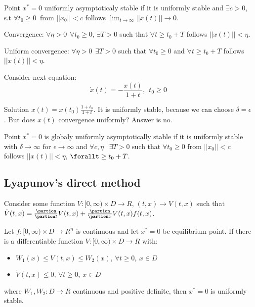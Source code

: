  Point $x^*=0$ uniformly asymptoticaly stable if it is uniformly stable and 
 $\exists c>0$, s.t $\forall t_0 \ge 0\ $ from $||x_0||<c$
 follows $\lim_{t\to \infty} ||x(t)|| \to 0$.


 Convergence: $\forall \eta > 0 \ \ \forall t_0 \ge 0$, $\exists T>0$ such
 that $\forall t \ge t_0+T$ follows $||x(t)||<\eta$.

 Uniform convergence: $\forall \eta > 0 \ \ \exists T>0$ such
 that $\forall t_0 \ge 0$ and $\forall t \ge t_0+T$ follows $||x(t)||<\eta$.


Consider next equation:
 \begin{equation}
   \dot x(t) = -\frac{x(t)}{1+t}, \ \ t_0\ge 0
 \end{equation}

 Solution $x(t)=x(t_0)\frac{1+t_0}{1+t}$. It is uniformly stable,
 because we can choose $\delta = \epsilon$. But does $x(t)$ convergence
 uniformly? Answer is no. 

 Point $x^*=0$ is globaly uniformly asymptotically stable if it is uniformly stable
 with $\delta \to \infty$ for $\epsilon \to \infty$ and $\forall c,\eta\ \ $ 
 $\exists T>0$ such that $\forall t_0\ge0$ from $||x_0||<c$ follows 
 $||x(t)||<\eta$, $\forallt \ge t_0 + T$.


\subsection{Lyapunov's direct method}

Consider some function $V:[0,\infty)\times D\to R$, $(t,x)\to V(t,x)$ such that
$\dot V(t,x)=\frac{\partion}{\partion t}V(t,x)+\frac{\partion}{\partion x}V(t,x) f(t,x)$.

 Let $f:[0,\infty)\times D\to R^n$ is continuous and let $x^*=0$ be equilibrium point.
 If there is a differentiable function $V:[0,\infty)\times D\to R$ with:
 \begin{itemize}
  \item $W_1(x) \le V(t,x) \le W_2(x)$, $\forall t\ge0,\ x\in D$
  \item $\dot V(t,x)\le 0$, $\forall t\ge0,\ x\in D$
 \end{itemize}
 where $W_1,W_2:D \to R$ continuous and positive definite, then $x^*=0$ is uniformly stable.

